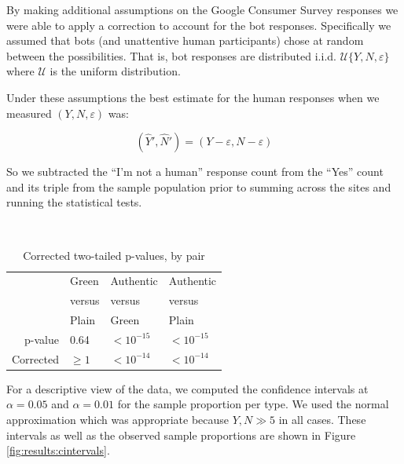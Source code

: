 \documentclass[twoside,letterpaper]{soups}
\begin{document}
By making additional assumptions on the Google Consumer Survey responses we were able to apply a correction to account for the bot responses. Specifically we assumed that bots (and unattentive human participants) chose at random between the possibilities. That is, bot responses are distributed i.i.d. $\mathcal U\{Y,N,\varepsilon\}$ where $\mathcal U$ is the uniform distribution.


Under these assumptions the best estimate for the human responses when we measured $(Y,N,\varepsilon)$ was:

\[ (\hat Y',\hat N')=(Y-\varepsilon,N-\varepsilon) \]

So we subtracted the ``I'm not a human'' response count from the ``Yes'' count and its triple from the sample population prior to summing across the sites and running the statistical tests.

\begin{table}
\centering
\caption{Corrected two-tailed p-values, by pair}
\mbox{}\\
\begin{tabular}{|r|l|l|l|}
\hline
                    & Green     & Authentic             & Authentic \\
                    & versus    & versus                & versus    \\
                    & Plain     & Green                 & Plain     \\
\hline
p-value             & 0.64    & $<10^{-15}$ & $<10^{-15}$ \\
\hline
Corrected           & $\ge 1$   & $<10^{-14}$ & $<10^{-14}$ \\
\hline
\end{tabular}
\label{fig:results:pvalues}
\end{table}

For a descriptive view of the data, we computed the confidence intervals at $\alpha = 0.05$ and $\alpha = 0.01$ for the sample proportion per type. We used the normal approximation which was appropriate because $Y, N \gg 5$ in all cases. These intervals as well as the observed sample proportions are shown in Figure \ref{fig:results:cintervals}.
\end{document}
